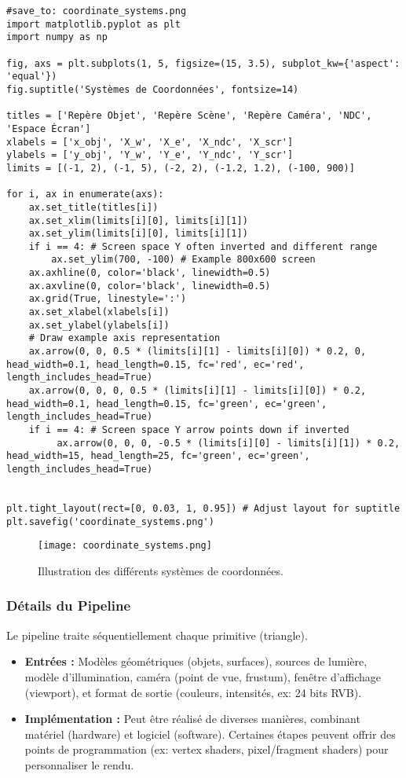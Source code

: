 \documentclass{article}
\begin{document}
\begin{verbatim}
#save_to: coordinate_systems.png
import matplotlib.pyplot as plt
import numpy as np

fig, axs = plt.subplots(1, 5, figsize=(15, 3.5), subplot_kw={'aspect': 'equal'})
fig.suptitle('Systèmes de Coordonnées', fontsize=14)

titles = ['Repère Objet', 'Repère Scène', 'Repère Caméra', 'NDC', 'Espace Écran']
xlabels = ['x_obj', 'X_w', 'X_e', 'X_ndc', 'X_scr']
ylabels = ['y_obj', 'Y_w', 'Y_e', 'Y_ndc', 'Y_scr']
limits = [(-1, 2), (-1, 5), (-2, 2), (-1.2, 1.2), (-100, 900)]

for i, ax in enumerate(axs):
    ax.set_title(titles[i])
    ax.set_xlim(limits[i][0], limits[i][1])
    ax.set_ylim(limits[i][0], limits[i][1])
    if i == 4: # Screen space Y often inverted and different range
        ax.set_ylim(700, -100) # Example 800x600 screen
    ax.axhline(0, color='black', linewidth=0.5)
    ax.axvline(0, color='black', linewidth=0.5)
    ax.grid(True, linestyle=':')
    ax.set_xlabel(xlabels[i])
    ax.set_ylabel(ylabels[i])
    # Draw example axis representation
    ax.arrow(0, 0, 0.5 * (limits[i][1] - limits[i][0]) * 0.2, 0, head_width=0.1, head_length=0.15, fc='red', ec='red', length_includes_head=True)
    ax.arrow(0, 0, 0, 0.5 * (limits[i][1] - limits[i][0]) * 0.2, head_width=0.1, head_length=0.15, fc='green', ec='green', length_includes_head=True)
    if i == 4: # Screen space Y arrow points down if inverted
         ax.arrow(0, 0, 0, -0.5 * (limits[i][0] - limits[i][1]) * 0.2, head_width=15, head_length=25, fc='green', ec='green', length_includes_head=True)


plt.tight_layout(rect=[0, 0.03, 1, 0.95]) # Adjust layout for suptitle
plt.savefig('coordinate_systems.png')
\end{verbatim}

\begin{figure}[H]
\centering
\texttt{[image: coordinate\_systems.png]}
\caption{Illustration des différents systèmes de coordonnées.}
\label{fig:coordinate_systems}
\end{figure}


\subsubsection{Détails du Pipeline}
Le pipeline traite séquentiellement chaque primitive (triangle).
\begin{itemize}
    \item \textbf{Entrées :} Modèles géométriques (objets, surfaces), sources de lumière, modèle d'illumination, caméra (point de vue, frustum), fenêtre d'affichage (viewport), et format de sortie (couleurs, intensités, ex: 24 bits RVB).
    \item \textbf{Implémentation :} Peut être réalisé de diverses manières, combinant matériel (hardware) et logiciel (software). Certaines étapes peuvent offrir des points de programmation (ex: vertex shaders, pixel/fragment shaders) pour personnaliser le rendu.
\end{itemize}
\end{document}
